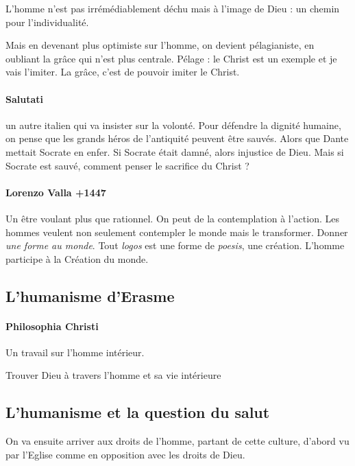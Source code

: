 \begin{Synthesis}
L'homme n'est pas irrémédiablement déchu mais à l'image de Dieu : un chemin pour l'individualité.
\end{Synthesis}
Mais en devenant plus optimiste sur l'homme, on devient pélagianiste, en oubliant la grâce qui n'est plus centrale. Pélage : le Christ est un exemple et je vais l'imiter. La grâce, c'est de pouvoir imiter le Christ.

\paragraph{Salutati} un autre italien qui va insister sur la volonté. Pour défendre la dignité humaine, on pense que les grands héros de l'antiquité peuvent être sauvés. Alors que Dante mettait Socrate en enfer. Si Socrate était damné, alors injustice de Dieu. Mais si Socrate est sauvé, comment penser le sacrifice du Christ ?

\paragraph{Lorenzo Valla +1447} Un être voulant plus que rationnel. On peut de la contemplation à l'action. Les hommes veulent non seulement contempler le monde mais le transformer. Donner \textit{une forme au monde}. Tout \textit{logos} est une forme de \textit{poesis}, une création. L'homme participe à la Création du monde.



\subsection{L’humanisme d’Erasme } 

\paragraph{Philosophia Christi} Un travail sur l'homme intérieur. 

\begin{Synthesis}
Trouver Dieu à travers l'homme et sa vie intérieure
\end{Synthesis}
\subsection{L’humanisme et la question du salut } 

On va ensuite arriver aux droits de l'homme, partant de cette culture, d'abord vu par l'Eglise comme en opposition avec les droits de Dieu.


